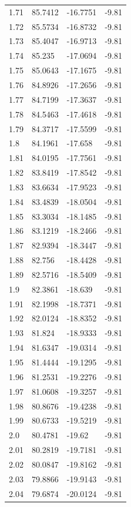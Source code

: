 \begin{tabular}{llll}
1.71 & 85.7412 & -16.7751 & -9.81 \\
1.72 & 85.5734 & -16.8732 & -9.81 \\
1.73 & 85.4047 & -16.9713 & -9.81 \\
1.74 & 85.235 & -17.0694 & -9.81 \\
1.75 & 85.0643 & -17.1675 & -9.81 \\
1.76 & 84.8926 & -17.2656 & -9.81 \\
1.77 & 84.7199 & -17.3637 & -9.81 \\
1.78 & 84.5463 & -17.4618 & -9.81 \\
1.79 & 84.3717 & -17.5599 & -9.81 \\
1.8 & 84.1961 & -17.658 & -9.81 \\
1.81 & 84.0195 & -17.7561 & -9.81 \\
1.82 & 83.8419 & -17.8542 & -9.81 \\
1.83 & 83.6634 & -17.9523 & -9.81 \\
1.84 & 83.4839 & -18.0504 & -9.81 \\
1.85 & 83.3034 & -18.1485 & -9.81 \\
1.86 & 83.1219 & -18.2466 & -9.81 \\
1.87 & 82.9394 & -18.3447 & -9.81 \\
1.88 & 82.756 & -18.4428 & -9.81 \\
1.89 & 82.5716 & -18.5409 & -9.81 \\
1.9 & 82.3861 & -18.639 & -9.81 \\
1.91 & 82.1998 & -18.7371 & -9.81 \\
1.92 & 82.0124 & -18.8352 & -9.81 \\
1.93 & 81.824 & -18.9333 & -9.81 \\
1.94 & 81.6347 & -19.0314 & -9.81 \\
1.95 & 81.4444 & -19.1295 & -9.81 \\
1.96 & 81.2531 & -19.2276 & -9.81 \\
1.97 & 81.0608 & -19.3257 & -9.81 \\
1.98 & 80.8676 & -19.4238 & -9.81 \\
1.99 & 80.6733 & -19.5219 & -9.81 \\
2.0 & 80.4781 & -19.62 & -9.81 \\
2.01 & 80.2819 & -19.7181 & -9.81 \\
2.02 & 80.0847 & -19.8162 & -9.81 \\
2.03 & 79.8866 & -19.9143 & -9.81 \\
2.04 & 79.6874 & -20.0124 & -9.81 \\

\end{tabular}
